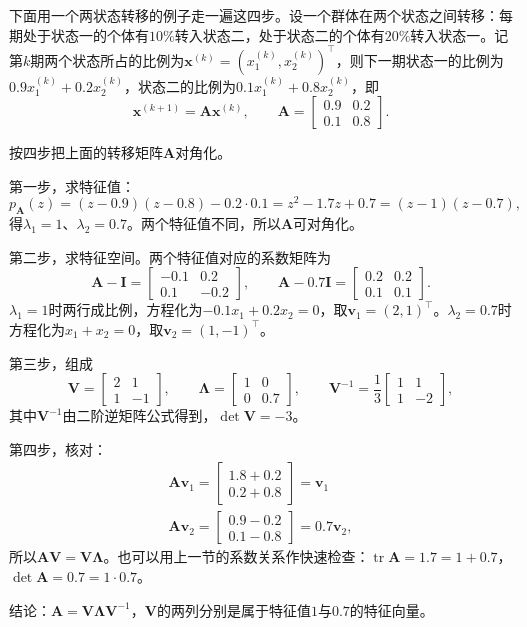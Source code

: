 下面用一个两状态转移的例子走一遍这四步。设一个群体在两个状态之间转移：每期处于状态一的个体有$10\%$转入状态二，处于状态二的个体有$20\%$转入状态一。记第$k$期两个状态所占的比例为$\bm x^{(k)}=(x_1^{(k)},x_2^{(k)})^{\top}$，则下一期状态一的比例为$0.9x_1^{(k)}+0.2x_2^{(k)}$，状态二的比例为$0.1x_1^{(k)}+0.8x_2^{(k)}$，即
\[
 \bm x^{(k+1)}=\bm A\bm x^{(k)},\qquad
 \bm A=\begin{bmatrix}0.9&0.2\\0.1&0.8\end{bmatrix}.
\]
\begin{example}[两状态转移矩阵的对角化]
\label{ex:ls-transition-matrix-diagonalization}
按四步把上面的转移矩阵$\bm A$对角化。

第一步，求特征值：
\[
 p_{\bm A}(z)=(z-0.9)(z-0.8)-0.2\cdot0.1=z^2-1.7z+0.7=(z-1)(z-0.7),
\]
得$\lambda_1=1$、$\lambda_2=0.7$。两个特征值不同，所以$\bm A$可对角化。

第二步，求特征空间。两个特征值对应的系数矩阵为
\[
 \bm A-\bm I=\begin{bmatrix}-0.1&0.2\\0.1&-0.2\end{bmatrix},\qquad
 \bm A-0.7\bm I=\begin{bmatrix}0.2&0.2\\0.1&0.1\end{bmatrix}.
\]
$\lambda_1=1$时两行成比例，方程化为$-0.1x_1+0.2x_2=0$，取$\bm v_1=(2,1)^{\top}$。$\lambda_2=0.7$时方程化为$x_1+x_2=0$，取$\bm v_2=(1,-1)^{\top}$。

第三步，组成
\[
 \bm V=\begin{bmatrix}2&1\\1&-1\end{bmatrix},\qquad
 \bm\Lambda=\begin{bmatrix}1&0\\0&0.7\end{bmatrix},\qquad
 \bm V^{-1}=\frac13\begin{bmatrix}1&1\\1&-2\end{bmatrix},
\]
其中$\bm V^{-1}$由二阶逆矩阵公式得到，$\det\bm V=-3$。

第四步，核对：
\[
\begin{gathered}
\bm A\bm v_1=\begin{bmatrix}1.8+0.2\\0.2+0.8\end{bmatrix}=\bm v_1\\
\bm A\bm v_2=\begin{bmatrix}0.9-0.2\\0.1-0.8\end{bmatrix}=0.7\bm v_2,
\end{gathered}
\]
所以$\bm A\bm V=\bm V\bm\Lambda$。也可以用上一节的系数关系作快速检查：$\operatorname{tr}\bm A=1.7=1+0.7$，$\det\bm A=0.7=1\cdot0.7$。

结论：$\bm A=\bm V\bm\Lambda\bm V^{-1}$，$\bm V$的两列分别是属于特征值$1$与$0.7$的特征向量。
\end{example}

